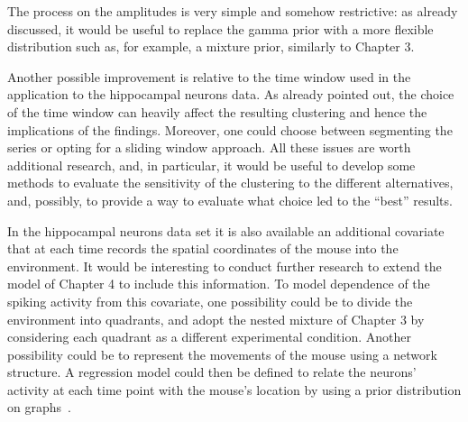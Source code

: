The process on the amplitudes is very simple and somehow restrictive: as already discussed, it would be useful to replace the gamma prior with a more flexible distribution such as, for example, a mixture prior, similarly to Chapter 3.

Another possible improvement is relative to the time window used in the application to the hippocampal neurons data. As already pointed out, the choice of the time window can heavily affect the resulting clustering and hence the implications of the findings. Moreover, one could choose between segmenting the series or opting for a sliding window approach. All these issues are worth additional research, and, in particular, it would be useful to develop some methods to evaluate the sensitivity of the clustering to the different alternatives, and, possibly, to provide a way to evaluate what choice led to the ``best'' results.

In the hippocampal neurons data set it is also available an additional covariate that at each time records the spatial coordinates of the mouse into the environment. It would be interesting to conduct further research to extend the model of Chapter 4 to include this information. To model dependence of the spiking activity from this covariate, one possibility could be to divide the environment into quadrants, and adopt the nested mixture of Chapter 3 by considering each quadrant as a different experimental condition.
Another possibility could be to represent the movements of the mouse using a network structure. A regression model could then be defined to relate the neurons' activity at each time point with the mouse's location by using a prior distribution on graphs~\parencite{cai2019}. 



